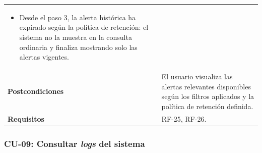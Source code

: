 {\begin{longtable}{p{3.2cm}p{10.2cm}}
\begin{minipage}[t]{10.2cm}
\begin{itemize}[noitemsep,leftmargin=*]
    \item Desde el paso 3, la alerta histórica ha expirado según la política de retención: el sistema no la muestra en la consulta ordinaria y finaliza mostrando solo las alertas vigentes.
\end{itemize}\end{minipage} \\
\textbf{Postcondiciones} & El usuario visualiza las alertas relevantes disponibles según los filtros aplicados y la política de retención definida. \\
\textbf{Requisitos} & RF-25, RF-26. \\
\bottomrule
\end{longtable}
\vspace{0.45em}
}

\clearpage
\subsubsection{CU-09: Consultar \textit{logs} del sistema}

